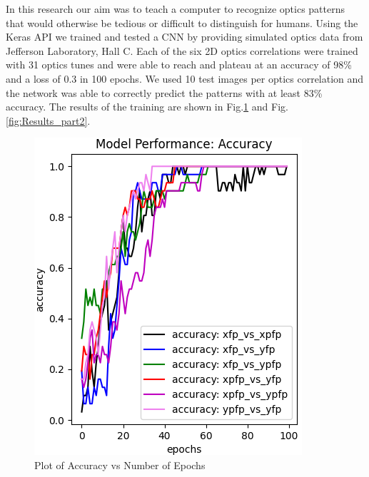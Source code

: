 \documentclass[conference]{IEEEtran}
\begin{document}
\indent In this research our aim was to teach a computer to recognize optics patterns that would otherwise be tedious or difficult to distinguish for humans. Using the Keras API we trained and tested a CNN by providing simulated optics data from Jefferson Laboratory, Hall C. Each of the six 2D optics correlations were trained with 31 optics tunes and were able to reach and plateau at an accuracy of 98\% and a loss of 0.3 in 100 epochs. We used 10 test images per optics correlation and the network was able to correctly predict the patterns with at least 83\% accuracy. The results of the training are shown in Fig.\ref{fig:Results_part1} and Fig.\ref{fig:Results_part2}. 

\begin{figure}[ht!]
  \centering
  \includegraphics[scale=0.6]{images/Results_part1.png}
  \caption{Plot of Accuracy vs Number of Epochs}
  \label{fig:Results_part1}
\end{figure}
\end{document}
